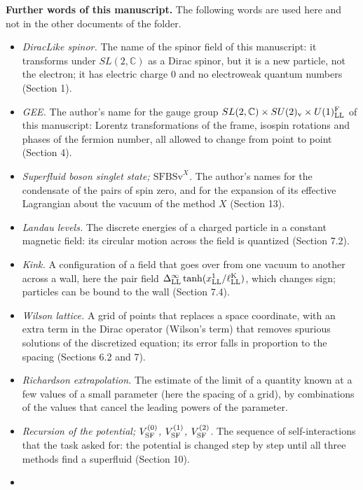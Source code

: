 \documentclass[
  10pt,
]{article}
\providecommand{\tightlist}{%
  \setlength{\itemsep}{0pt}\setlength{\parskip}{0pt}}
\begin{document}
\textbf{Further words of this manuscript.} The following words are used
here and not in the other documents of the folder.

\begin{itemize}
\tightlist
\item
  \emph{DiracLike spinor.} The name of the spinor field of this
  manuscript: it transforms under \(SL(2,\mathbb C)\) as a Dirac spinor,
  but it is a new particle, not the electron; it has electric charge 0
  and no electroweak quantum numbers (Section 1).
\item
  \emph{GEE.} The author's name for the gauge group
  \(SL(2,\mathbb C)\times SU(2)_{\rm v}\times U(1)^{\rm F}_{\rm LL}\) of
  this manuscript: Lorentz transformations of the frame, isospin
  rotations and phases of the fermion number, all allowed to change from
  point to point (Section 4).
\item
  \emph{Superfluid boson singlet state; \(\mathrm{SFBSv}^X\).} The
  author's names for the condensate of the pairs of spin zero, and for
  the expansion of its effective Lagrangian about the vacuum of the
  method \(X\) (Section 13).
\item
  \emph{Landau levels.} The discrete energies of a charged particle in a
  constant magnetic field: its circular motion across the field is
  quantized (Section 7.2).
\item
  \emph{Kink.} A configuration of a field that goes over from one vacuum
  to another across a wall, here the pair field
  \(\Delta^\infty_{\rm LL}\tanh(x^1_{\rm LL}/\ell^{\rm K}_{\rm LL})\),
  which changes sign; particles can be bound to the wall (Section 7.4).
\item
  \emph{Wilson lattice.} A grid of points that replaces a space
  coordinate, with an extra term in the Dirac operator (Wilson's term)
  that removes spurious solutions of the discretized equation; its error
  falls in proportion to the spacing (Sections 6.2 and 7).
\item
  \emph{Richardson extrapolation.} The estimate of the limit of a
  quantity known at a few values of a small parameter (here the spacing
  of a grid), by combinations of the values that cancel the leading
  powers of the parameter.
\item
  \emph{Recursion of the potential; \(V^{(0)}_{\rm SF}\),
  \(V^{(1)}_{\rm SF}\), \(V^{(2)}_{\rm SF}\).} The sequence of
  self-interactions that the task asked for: the potential is changed
  step by step until all three methods find a superfluid (Section 10).
\item

\end{itemize}
\end{document}
